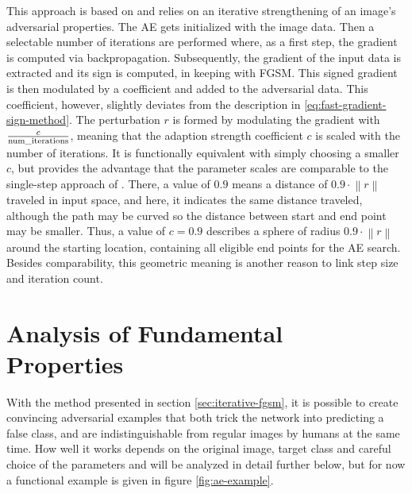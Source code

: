 \documentclass[11pt, a4paper]{article}
\newcommand{\norm}[1]{\left\lVert#1\right\rVert}
\begin{document}
This approach is based on \cite{how-to-trick-neural-network-panda-to-vulture} and relies on an iterative strengthening of an image's adversarial properties. The AE gets initialized with the image data. Then a selectable number of iterations are performed where, as a first step, the gradient is computed via backpropagation. Subsequently, the gradient of the input data is extracted and its sign is computed, in keeping with FGSM. This signed gradient is then modulated by a coefficient and added to the adversarial data. This coefficient, however, slightly deviates from the description in \eqref{eq:fast-gradient-sign-method}. The perturbation $r$ is formed by modulating the gradient with $\frac{c}{\text{num\_iterations}}$, meaning that the adaption strength coefficient $c$ is scaled with the number of iterations. It is functionally equivalent with simply choosing a smaller $c$, but provides the advantage that the parameter scales are comparable to the single-step approach of \cite{explaining-and-harnessing-adversarial-examples}. There, a value of $0.9$ means a distance of $0.9 \cdot \norm{r}$ traveled in input space, and here, it indicates the same distance traveled, although the path may be curved so the distance between start and end point may be smaller. Thus, a value of $c = 0.9$ describes a sphere of radius $0.9 \cdot \norm{r}$ around the starting location, containing all eligible end points for the AE search. Besides comparability, this geometric meaning is another reason to link step size and iteration count.











\section{Analysis of Fundamental Properties}
\label{sec:fundamental-properties}
With the method presented in section \ref{sec:iterative-fgsm}, it is possible to create convincing adversarial examples that both trick the network into predicting a false class, and are indistinguishable from regular images by humans at the same time. How well it works depends on the original image, target class and careful choice of the parameters and will be analyzed in detail further below, but for now a functional example is given in figure \ref{fig:ae-example}.
\end{document}
